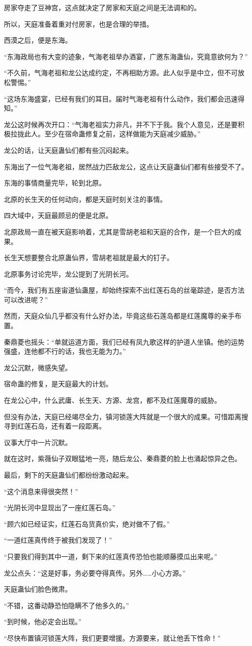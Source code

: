 \begin{this_body}
房家夺走了豆神宫，这点就决定了房家和天庭之间是无法调和的。

所以，天庭准备着重对付房家，也是合理的举措。

西漠之后，便是东海。

“东海政局也有大变的迹象，气海老祖举办酒宴，广邀东海蛊仙，究竟意欲何为？”

“不久前，气海老祖和龙公达成约定，不再相助方源。此人似乎是中立，但不可放松警惕。”

“这场东海盛宴，已经有我们的耳目。届时气海老祖有什么动作，我们都会迅速得知。”

龙公这时候再次开口：“气海老祖实力非凡，并不下于我。我个人意见，还是要积极拉拢此人。至少在宿命蛊修复之前，这样做能为天庭减少威胁。”

龙公的话，让天庭蛊仙们都有些沉闷起来。

东海出了一位气海老祖，居然战力匹敌龙公，这点让天庭蛊仙们都有些接受不了。

东海的事情商量完毕，轮到北原。

北原的长生天的任何动向，都是天庭时刻关注的事情。

四大域中，天庭最顾忌的便是北原。

北原政局一直在被天庭影响着，尤其是雪胡老祖和天庭的合作，是一个巨大的成果。

长生天想要整合北原蛊仙界，雪胡老祖就是最大的钉子。

北原事务讨论完毕，龙公提到了光阴长河。

“而今，我们有五座宙道仙蛊屋，却始终探索不出红莲石岛的丝毫踪迹，是否方法可以改进呢？”

然而，天庭众仙几乎都没有什么好办法，毕竟这些石莲岛都是红莲魔尊的亲手布置。

秦鼎菱也摇头：“单就运道方面，我们已经有凤九歌这样的护道人坐镇。他的运势强盛，连他都不行的话，我也无能为力。”

龙公沉默，微感失望。

宿命蛊的修复，是天庭最大的计划。

在龙公心中，什么武庸、长生天、方源、龙宫，都不及红莲魔尊的威胁。

但没有办法，天庭已经竭尽全力，镇河锁莲大阵就是一个很大的成果。可惜距离搜寻到红莲石岛，还有着一段距离。

议事大厅中一片沉默。

就在这时，紫薇仙子双眼猛地一亮，随后龙公、秦鼎菱的脸上也涌起惊异之色。

最后，剩下的天庭蛊仙们都纷纷激动起来。

“这个消息来得很突然！”

“光阴长河中显现出了一座红莲石岛。”

“顾六如已经证实，红莲石岛货真价实，绝对做不了假。”

“一道红莲真传终于被我们发现了！”

“只要我们得到其中一道，剩下来的红莲真传恐怕也能顺藤摸瓜出来呢。”

龙公点头：“这是好事，务必要夺得真传。另外……小心方源。”

天庭蛊仙们脸色微肃。

“不错，这番动静恐怕隐瞒不了他多久的。”

“到时候，他必定会出现。”

“尽快布置镇河锁莲大阵，我们更要增援。方源要来，就让他丢下性命！”

\end{this_body}

